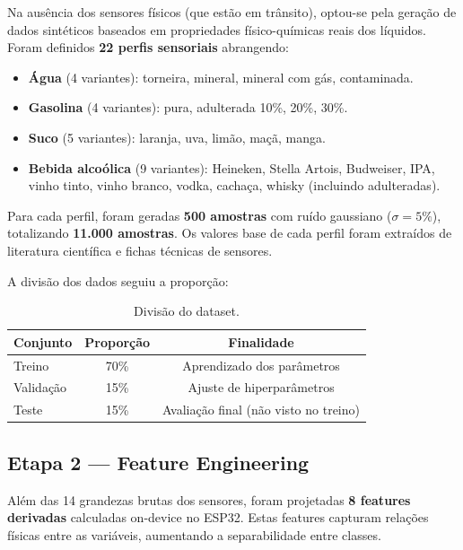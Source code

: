 \documentclass[12pt, a4paper]{article}
\begin{document}
Na aus\^{e}ncia dos sensores f\'{i}sicos (que est\~{a}o em tr\^{a}nsito), optou-se pela gera\c{c}\~{a}o de dados sint\'{e}ticos baseados em propriedades f\'{i}sico-qu\'{i}micas reais dos l\'{i}quidos. Foram definidos \textbf{22 perfis sensoriais} abrangendo:

\begin{itemize}
  \item \textbf{\'{A}gua} (4 variantes): torneira, mineral, mineral com g\'{a}s, contaminada.
  \item \textbf{Gasolina} (4 variantes): pura, adulterada 10\%, 20\%, 30\%.
  \item \textbf{Suco} (5 variantes): laranja, uva, lim\~{a}o, ma\c{c}\~{a}, manga.
  \item \textbf{Bebida alco\'{o}lica} (9 variantes): Heineken, Stella Artois, Budweiser, IPA, vinho tinto, vinho branco, vodka, cacha\c{c}a, whisky (incluindo adulteradas).
\end{itemize}

Para cada perfil, foram geradas \textbf{500 amostras} com ru\'{i}do gaussiano ($\sigma = 5\%$), totalizando \textbf{11.000 amostras}. Os valores base de cada perfil foram extra\'{i}dos de literatura cient\'{i}fica e fichas t\'{e}cnicas de sensores.

A divis\~{a}o dos dados seguiu a propor\c{c}\~{a}o:

\begin{table}[H]
  \centering
  \caption{Divis\~{a}o do dataset.}
  \begin{tabular}{lcc}
    \toprule
    \textbf{Conjunto} & \textbf{Propor\c{c}\~{a}o} & \textbf{Finalidade} \\
    \midrule
    Treino    & 70\% & Aprendizado dos par\^{a}metros \\
    Valida\c{c}\~{a}o & 15\% & Ajuste de hiperpar\^{a}metros \\
    Teste     & 15\% & Avalia\c{c}\~{a}o final (n\~{a}o visto no treino) \\
    \bottomrule
  \end{tabular}
\end{table}

\subsection{Etapa 2 --- Feature Engineering}

Al\'{e}m das 14 grandezas brutas dos sensores, foram projetadas \textbf{8 features derivadas} calculadas on-device no ESP32. Estas features capturam rela\c{c}\~{o}es f\'{i}sicas entre as vari\'{a}veis, aumentando a separabilidade entre classes.
\end{document}
